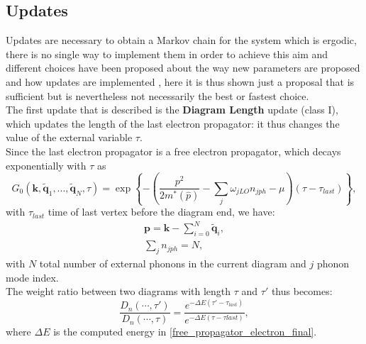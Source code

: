 \subsection{Updates}
Updates are necessary to obtain a Markov chain for the system which is ergodic, there is no single way to implement them in order to 
achieve this aim and different choices have been proposed about the way new parameters are proposed and how updates are implemented 
\cite{mishchenko2000diagrammatic}\cite{hahn2018diagrammatic}, here it is thus shown just a proposal that is sufficient but is nevertheless not 
necessarily the best or fastest choice.\\
The first update that is described is the \textbf{Diagram Length} update (class I), which updates the length of the last electron propagator: it thus changes the 
value of the external variable $\tau$.\\
Since the last electron propagator is a free electron propagator, which decays exponentially with $\tau$ as
\begin{equation}
    G_0(\mathbf{k},\tilde{\mathbf{q}}_1,...,\tilde{\mathbf{q}}_N,\tau)=\exp{ \left\{-\left(\frac{p^2}{2m^*(\hat{p})}-\sum_{j}\omega_{jLO}n_{jph}-\mu \right)(\tau-\tau_{last})\right\}},
    \label{free_propagator_electron_final}
\end{equation}
with $\tau_{last}$ time of last vertex before the diagram end,  we have:
\begin{equation}
\begin{split}
    \mathbf{p}=\mathbf{k}-\sum_{i=0}^N\tilde{\mathbf{q}}_i,\\
    \sum_j n_{jph}=N,
\end{split}
\end{equation}
with $N$ total number of external phonons in the current diagram and $j$ phonon mode index.\\
The weight ratio between two diagrams with length $\tau$ and $\tau'$ thus becomes:
\begin{equation}
    \frac{D_n(\cdots,\tau')}{D_n(\cdots,\tau)}=\frac{e^{-\Delta E (\tau'-\tau_{last})}}{e^{-\Delta E (\tau-\tau{last})}},
    \label{weights_diagram_length}
\end{equation}
where $\Delta E$ is the computed energy in \ref{free_propagator_electron_final}.
